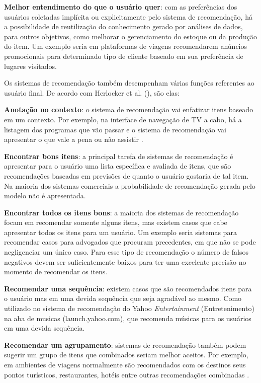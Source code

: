 \textbf{Melhor entendimento do que o usuário quer}: com as preferências dos usuários coletadas implícita ou explicitamente pelo sistema de recomendação, há a possibilidade de reutilização do conhecimento gerado por análises de dados, para outros objetivos, como melhorar o gerenciamento do estoque ou da produção do item. Um exemplo seria em plataformas de viagens recomendarem anúncios promocionais para determinado tipo de cliente baseado em sua preferência de lugares visitados.

Os sistemas de recomendação também desempenham várias funções referentes ao usuário final. De acordo com Herlocker et al. (\citeyear{Herlocker:2004}), são elas:

\textbf{Anotação no contexto}: o sistema de recomendação vai enfatizar itens baseado em um contexto. Por exemplo, na interface de navegação de TV a cabo, há a listagem dos programas que vão passar e o sistema de recomendação vai apresentar o que vale a pena ou não assistir \cite{Ricci:2010}.

\textbf{Encontrar bons itens}: a principal tarefa de sistemas de recomendação é apresentar para o usuário uma lista específica e avaliada de itens, que são recomendações baseadas em previsões de quanto o usuário gostaria de tal item. Na maioria dos sistemas comerciais a probabilidade de recomendação gerada pelo modelo não é apresentada.

\textbf{Encontrar todos os itens bons}: a maioria dos sistemas de recomendação focam em recomendar somente alguns itens, mas existem casos que cabe apresentar todos os itens para um usuário. Um exemplo seria sistemas para recomendar casos para advogados que procuram precedentes, em que não se pode negligenciar um único caso. Para esse tipo de recomendação o número de falsos negativos devem ser suficientemente baixos para ter uma excelente precisão no momento de recomendar os itens.

\textbf{Recomendar uma sequência}: existem casos que são recomendados itens para o usuário mas em uma devida sequência que seja agradável ao mesmo. Como utilizado no sistema de recomendação do Yahoo \textit{Entertainment} (Entretenimento) na aba de musicas (launch.yahoo.com), que recomenda músicas para os usuários em uma devida sequência.

\textbf{Recomendar um agrupamento}: sistemas de recomendação também podem sugerir um grupo de itens que combinados seriam melhor aceitos. Por exemplo, em ambientes de viagens normalmente são recomendados com os destinos seus pontos turísticos, restaurantes, hotéis entre outras recomendações combinadas \cite{Ricci:2010}.

